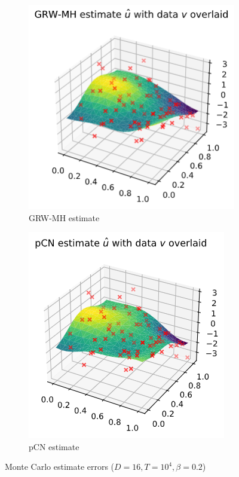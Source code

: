 \documentclass[]{article}
\begin{document}
\begin{figure}[!h]
	\centering
	\begin{subfigure}{0.32\linewidth}
		\includegraphics[width=\linewidth]{grw-mh-estimate.png}
		\caption{GRW-MH estimate}
		\label{fig:grw-estimate}
	\end{subfigure}
	\begin{subfigure}{0.31\linewidth}
		\includegraphics[width=\linewidth]{pcn-estimate.png}
		\caption{pCN estimate}
		\label{fig:pcn-estimate}
	\end{subfigure}
	\caption{Monte Carlo estimate errors ($D=16, T=10^4, \beta=0.2$)}
	\label{fig:u-estimate}
\end{figure}
\end{document}
